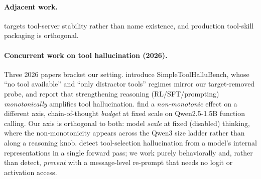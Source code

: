 \paragraph{Adjacent work.}
\citet{stableTOOLbench2024} targets tool-server stability rather than
name existence, and production tool-skill packaging
\citep{anthropicagentskills2025} is orthogonal.

\paragraph{Concurrent work on tool hallucination (2026).}
Three 2026 papers bracket our setting. \citet{yin2026reasoningtrap}
introduce SimpleToolHalluBench, whose ``no tool available'' and
``only distractor tools'' regimes mirror our target-removed probe, and
report that strengthening reasoning (RL/SFT/prompting) \emph{monotonically}
amplifies tool hallucination. \citet{qi2026brief} find a \emph{non-monotonic}
effect on a different axis, chain-of-thought \emph{budget} at fixed scale
on Qwen2.5-1.5B function calling. Our axis is orthogonal to both: model
\emph{scale} at fixed (disabled) thinking, where the non-monotonicity
appears across the Qwen3 size ladder rather than along a reasoning knob.
\citet{healy2026internal} detect tool-selection hallucination from a model's
internal representations in a single forward pass; we work purely
behaviorally and, rather than detect, \emph{prevent} with a message-level
re-prompt that needs no logit or activation access.
